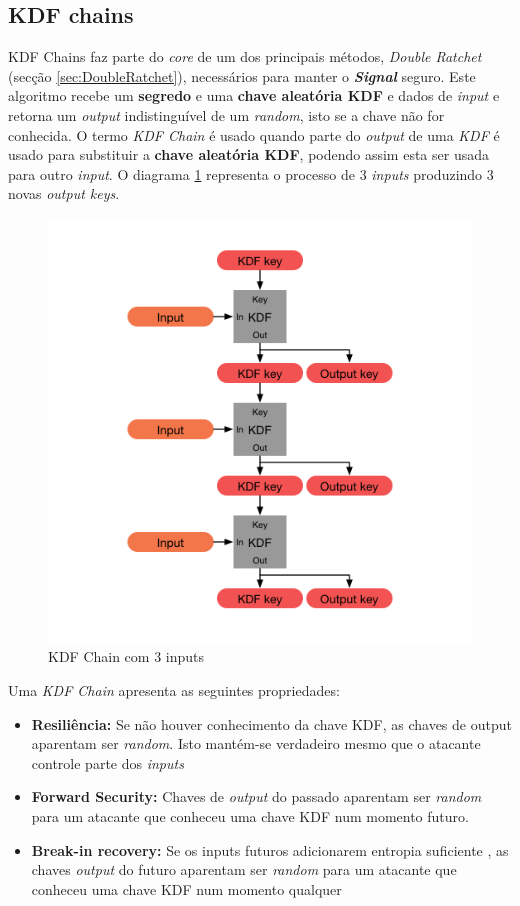 \subsection{KDF chains}\label{sec:KDF}
KDF Chains faz parte do \emph{core} de um dos principais métodos, \emph{Double Ratchet} (secção \ref{sec:DoubleRatchet}), necessários para manter o \textbf{\textit{Signal}} seguro.
Este algoritmo recebe um \textbf{segredo} e uma \textbf{chave aleatória KDF} e dados de \emph{input} e retorna um \emph{output} indistinguível de um \emph{random}, isto se a chave não for conhecida.
O termo \emph{KDF Chain} é usado quando parte do \emph{output} de uma \emph{KDF} é usado para substituir a \textbf{chave aleatória KDF}, podendo assim esta ser usada para outro \emph{input}. O diagrama \ref{diagram:kdfChain} representa o processo de 3 \emph{inputs} produzindo 3 novas \emph{output keys}.


\begin{figure}[H]
\begin{center}
\includegraphics[width=12cm]{img/kdfChain.png}
\caption{KDF Chain com 3 inputs}
\label{diagram:kdfChain}
\centering
\end{center}
\end{figure}

Uma \emph{KDF Chain} apresenta as seguintes propriedades:

\begin{itemize}
    \item \textbf{Resiliência:} Se não houver conhecimento da chave KDF, as chaves de output aparentam ser \emph{random}. Isto mantém-se verdadeiro mesmo que o atacante controle parte dos \emph{inputs}
    \item \textbf{Forward Security:} Chaves de \textit{output} do passado aparentam ser \emph{random} para um atacante que conheceu uma chave KDF num momento futuro.
    \item \textbf{Break-in recovery:} Se os inputs futuros adicionarem entropia suficiente , as chaves \textit{output} do futuro aparentam ser \emph{random} para um atacante que conheceu uma chave KDF num momento qualquer
\end{itemize}

